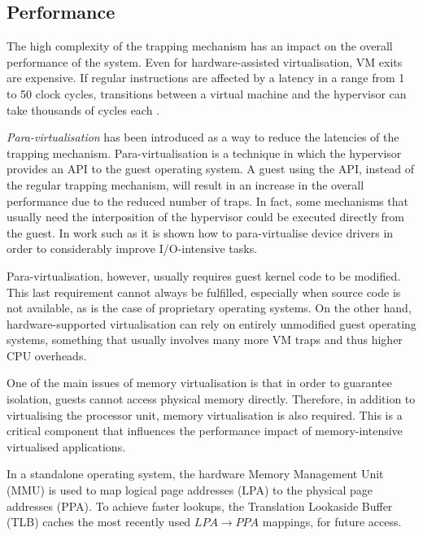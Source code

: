 \clearpage
\subsection{Performance}\label{virtperf}
The high complexity of the trapping mechanism has an impact on the overall performance of the system. Even for hardware-assisted virtualisation, VM exits are expensive. If regular instructions are affected by a latency in a range from 1 to 50 clock cycles, transitions between a virtual machine and the hypervisor can take thousands of cycles each \cite{intel-optimization}.  
   
\emph{Para-virtualisation} has been introduced as a way to reduce the latencies of the trapping mechanism. Para-virtualisation is a technique in which the hypervisor provides an API to the guest operating system. A guest using the API, instead of the regular trapping mechanism, will result in an increase in the overall performance due to the reduced number of traps. In fact, some mechanisms that usually need the interposition of the hypervisor could be executed directly from the guest. In work such as \cite{virtio, HPC, xenart} it is shown how to para-virtualise device drivers in order to considerably improve I/O-intensive tasks.%
 
Para-virtualisation, however, usually requires guest kernel code to be modified. This last requirement cannot always be fulfilled, especially when source code is not available, as is the case of proprietary operating systems. On the other hand, hardware-supported virtualisation can rely on entirely unmodified guest operating systems, something that usually involves many more VM traps and thus higher CPU overheads.%

One of the main issues of memory virtualisation is that in order to guarantee isolation, guests cannot access physical memory directly. Therefore, in addition to virtualising the processor unit, memory virtualisation is also required. This is a critical component that influences the performance impact of memory-intensive virtualised applications. 

In a standalone operating system, the hardware Memory Management Unit (MMU) is used to map logical page addresses (LPA) to the physical page addresses (PPA). To achieve faster lookups, the Translation Lookaside Buffer (TLB) caches the most recently used $LPA \rightarrow PPA$ mappings, for future access.%


